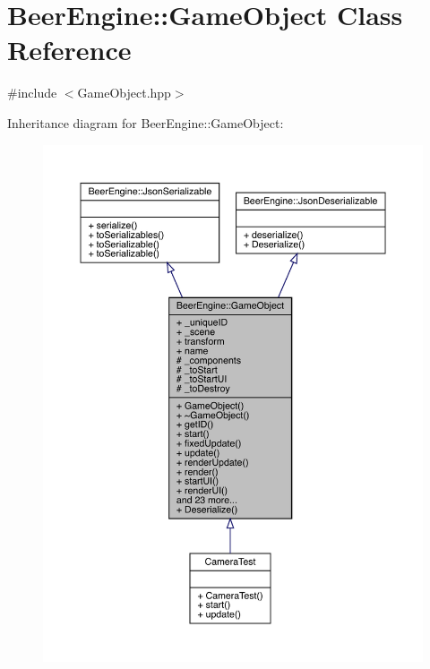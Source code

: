 \hypertarget{class_beer_engine_1_1_game_object}{}\section{Beer\+Engine\+:\+:Game\+Object Class Reference}
\label{class_beer_engine_1_1_game_object}


{\ttfamily \#include $<$Game\+Object.\+hpp$>$}



Inheritance diagram for Beer\+Engine\+:\+:Game\+Object\+:\nopagebreak
\begin{figure}[H]
\begin{center}
\leavevmode
\includegraphics[width=350pt]{class_beer_engine_1_1_game_object__inherit__graph}
\end{center}
\end{figure}


